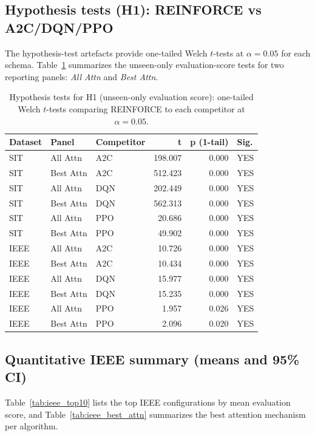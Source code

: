 \documentclass[sn-basic]{sn-jnl} %
\begin{document}
\subsection{Hypothesis tests (H1): REINFORCE vs A2C/DQN/PPO}
\label{sec:hypothesis_tests}
The hypothesis-test artefacts provide one-tailed Welch $t$-tests at $\alpha=0.05$ for each schema. Table~\ref{tab:hyp_tests} summarizes the unseen-only evaluation-score tests for two reporting panels: \emph{All Attn} and \emph{Best Attn}.

\begin{table}[t]
        \centering
        \caption{Hypothesis tests for H1 (unseen-only evaluation score): one-tailed Welch $t$-tests comparing REINFORCE to each competitor at $\alpha=0.05$.}
        \label{tab:hyp_tests}
        \begin{tabular}{l l l r r l}
        \toprule
        \textbf{Dataset} & \textbf{Panel} & \textbf{Competitor} & \textbf{t} & \textbf{p (1-tail)} & \textbf{Sig.}\\
        \midrule
        SIT & All Attn & A2C & 198.007 & 0.000 & YES\\
        SIT & Best Attn & A2C & 512.423 & 0.000 & YES\\
        SIT & All Attn & DQN & 202.449 & 0.000 & YES\\
        SIT & Best Attn & DQN & 562.313 & 0.000 & YES\\
        SIT & All Attn & PPO & 20.686 & 0.000 & YES\\
        SIT & Best Attn & PPO & 49.902 & 0.000 & YES\\
        IEEE & All Attn & A2C & 10.726 & 0.000 & YES\\
        IEEE & Best Attn & A2C & 10.434 & 0.000 & YES\\
        IEEE & All Attn & DQN & 15.977 & 0.000 & YES\\
        IEEE & Best Attn & DQN & 15.235 & 0.000 & YES\\
        IEEE & All Attn & PPO & 1.957 & 0.026 & YES\\
        IEEE & Best Attn & PPO & 2.096 & 0.020 & YES\\
        \bottomrule
        \end{tabular}
\end{table}

\subsection{Quantitative IEEE summary (means and 95\% CI)}
\label{sec:ieee_summary}
Table~\ref{tab:ieee_top10} lists the top IEEE configurations by mean evaluation score, and Table~\ref{tab:ieee_best_attn} summarizes the best attention mechanism per algorithm.
\end{document}
